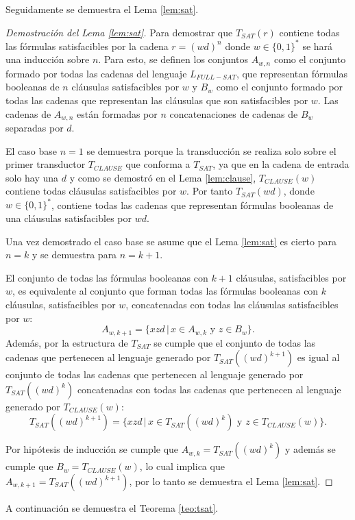 \documentclass[12pt]{article}
\begin{document}
Seguidamente se demuestra el Lema \ref{lem:sat}. 

\begin{proof}[Demostración del Lema \ref{lem:sat}]
    Para demostrar que $T_{SAT}(r)$ contiene todas las fórmulas satisfacibles por la cadena $r=(wd)^n$ donde 
    $w\in\{0,1\}^*$ se hará una inducción sobre $n$. Para esto, se definen los conjuntos $A_{w,n}$ como el 
    conjunto formado por todas las cadenas del lenguaje $L_{FULL-SAT}$, que representan fórmulas booleanas de 
    $n$ cláusulas satisfacibles por $w$ y $B_w$ como el conjunto formado por todas las cadenas que representan 
    las cláusulas que son satisfacibles por $w$. Las cadenas de $A_{w,n}$ están formadas por $n$ concatenaciones
    de cadenas de $B_w$ separadas por $d$.
    
    El caso base $n=1$ se demuestra porque la transducción se realiza solo sobre el primer transductor 
    $T_{CLAUSE}$ que conforma a $T_{SAT}$, ya que en la cadena de entrada solo hay una $d$ y como se demostró 
    en el Lema \ref{lem:clause}, $T_{CLAUSE}(w)$ contiene todas cláusulas satisfacibles por $w$. Por tanto
    $T_{SAT}(wd)$, donde $w\in \{0,1\}^*$, contiene todas las cadenas que representan fórmulas booleanas
    de una cláusulas satisfacibles por $wd$.
    
    Una vez demostrado el caso base se asume que el Lema \ref{lem:sat} es cierto para $n=k$ y se demuestra 
    para $n=k+1$. 
    
    El conjunto de todas las fórmulas booleanas con $k+1$ cláusulas, satisfacibles por $w$, es equivalente al conjunto 
    que forman todas las fórmulas booleanas con $k$ cláusulas, satisfacibles por $w$,  concatenadas con todas las 
    cláusulas satisfacibles por $w$: $$A_{w,k+1}=\{xzd\,|\,x\in A_{w,k} \text{ y } z\in B_w\}.$$  Además, por la estructura 
    de $T_{SAT}$ se cumple que el conjunto de todas las cadenas que pertenecen al lenguaje generado por $T_{SAT}((wd)^{k+1})$
    es igual al conjunto de todas las cadenas que pertenecen al lenguaje generado por $T_{SAT}((wd)^{k})$
    concatenadas con todas las cadenas que pertenecen al lenguaje generado por $T_{CLAUSE}(w)$:
    $$T_{SAT}((wd)^{k+1})=\{xzd\,|\,x\in T_{SAT}((wd)^{k}) \text{ y } z\in T_{CLAUSE}(w)\}.$$
    
    Por hipótesis de inducción se cumple que $A_{w,k}=T_{SAT}((wd)^{k})$ y además se cumple que $B_w=T_{CLAUSE}(w)$, lo cual implica que $A_{w,k+1}=T_{SAT}((wd)^{k+1})$, por lo tanto se demuestra el Lema \ref{lem:sat}.
    
\end{proof}
A continuación se demuestra el Teorema \ref{teo:tsat}.
\end{document}
